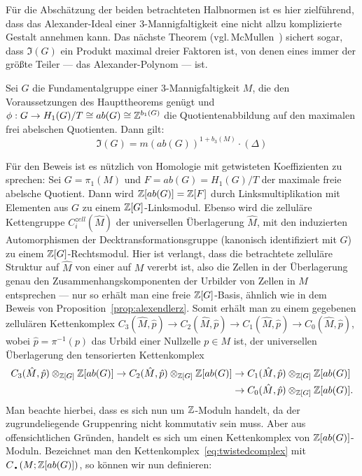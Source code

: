     Für die Abschätzung der beiden betrachteten Halbnormen ist es hier zielführend, dass das Alexander-Ideal einer 3-Mannigfaltigkeit eine nicht allzu komplizierte Gestalt annehmen kann. Das nächste Theorem (vgl.\,McMullen~\cite{MCMULLEN.2002}) sichert sogar, dass $\mathfrak I(G)$ ein Produkt maximal dreier Faktoren ist, von denen eines immer der größte Teiler --- das Alexander-Polynom --- ist. 

\begin{thm}
\label{thm:keralexnorm}
	Sei $G$ die Fundamentalgruppe einer 3-Mannigfaltigkeit $M$, die den Voraussetzungen des Haupttheorems genügt und $\phi:G \to H_1(G)/T \cong ab(G) \cong \mathbb{Z}^{b_1(G)}$ die Quotientenabbildung auf den maximalen frei abelschen Quotienten. Dann gilt:
	\[
		\mathfrak I(G) = m(ab(G))^{1+b_3(M)}\cdot (\Delta) 
	\]
\end{thm}

	Für den Beweis ist es nützlich von Homologie mit getwisteten Koeffizienten zu sprechen: Sei $G=\pi_1(M)$ und $F=ab(G)=H_1(G)/T$ der maximale freie abelsche Quotient. Dann wird $\mathbb{Z}[ab(G)]=\mathbb{Z}[F]$ durch Linksmultiplikation mit Elementen aus $G$ zu einem $\mathbb{Z}[G]$-Linksmodul. Ebenso wird die zelluläre Kettengruppe $C^{zell}_i(\hat M)$ der universellen Überlagerung $\hat M$, mit den induzierten Automorphismen der Decktransformationsgruppe (kanonisch identifiziert mit $G$) zu einem $\mathbb{Z}[G]$-Rechtsmodul. Hier ist verlangt, dass die betrachtete zelluläre Struktur auf $\hat M$ von einer auf $M$ vererbt ist, also die Zellen in der Überlagerung genau den Zusammenhangskomponenten der Urbilder von Zellen in $M$ entsprechen --- nur so erhält man eine freie $\mathbb{Z}[G]$-Basis, ähnlich wie in dem Beweis von Proposition~\ref{prop:alexendlerz}. Somit erhält man zu einem gegebenen zellulären Kettenkomplex $C_3(\hat M,\hat p) \to C_2(\hat M,\hat p) \to C_1(\hat M,\hat p) \to C_0(\hat M,\hat p)$, wobei $\hat p = \pi^{-1}(p)$ das Urbild einer Nullzelle $p\in M$ ist, der universellen Überlagerung den tensorierten Kettenkomplex 
\begin{align}
			C_3(\hat M,\hat p)\otimes_{\mathbb{Z}[G]}\mathbb{Z}[ab(G)] \to C_2(\hat M,\hat p)\otimes_{\mathbb{Z}[G]}\mathbb{Z}[ab(G)]& \to C_1(\hat M,\hat p)\otimes_{\mathbb{Z}[G]}\mathbb{Z}[ab(G)] \label{eq:twistedcomplex}\\
			& \to C_0(\hat M,\hat p)\otimes_{\mathbb{Z}[G]}\mathbb{Z}[ab(G)]  \notag .
	\end{align}	
	Man beachte hierbei, dass es sich nun um $\mathbb{Z}$-Moduln handelt, da der zugrundeliegende Gruppenring nicht kommutativ sein muss. Aber aus offensichtlichen Gründen, handelt es sich um einen Kettenkomplex von $\mathbb{Z}[ab(G)]$-Moduln. Bezeichnet man den Kettenkomplex~\eqref{eq:twistedcomplex} mit $C_\text{\textbullet}(M;\ZZ[ab(G)])$, so können wir nun definieren:

